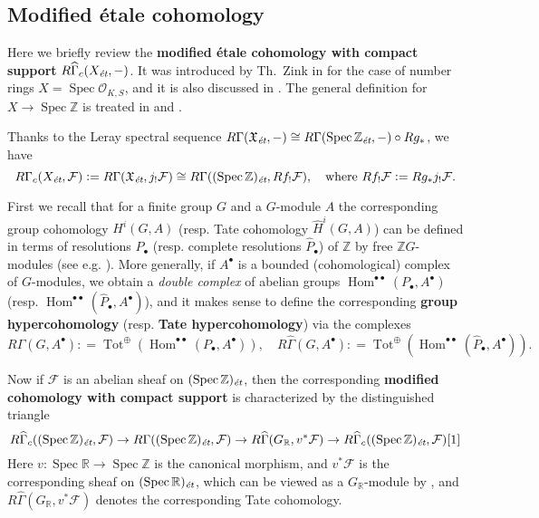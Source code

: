 \documentclass[leqno,12pt]{article}
\theoremstyle{plain}
\theoremstyle{definition}
\DeclareMathOperator{\Spec}{Spec}
\DeclareMathOperator{\Hom}{Hom}
\DeclareMathOperator{\Tot}{Tot}
\newcommand{\RR}{\mathbb{R}}
\newcommand{\ZZ}{\mathbb{Z}}
\newcommand{\dfn}{\mathrel{\mathop:}=}
\newcommand{\et}{\text{\it \'{e}t}}
\begin{document}
\subsection*{Modified \'{e}tale cohomology}

Here we briefly review the
\textbf{modified \'{e}tale cohomology with compact support}
$R\widehat{\Gamma}_c (X_\et, -)$. It was introduced by Th.~Zink in
\cite[Appendix~2]{Haberland-1978} for the case of number rings
$X = \Spec \mathcal{O}_{K,S}$, and it is also discussed in
\cite[\S II.2]{Milne-ADT}. The general definition for $X \to \Spec\ZZ$
is treated in \cite[\S 6.7]{Flach-Morin-2018} and
\cite[\S 2]{Geisser-Schmidt-2018}.

Thanks to the Leray spectral sequence
$R\Gamma (\mathfrak{X}_\et, -) \cong R\Gamma (\Spec \ZZ_\et, -)\circ R g_*$,
we have
\[
  R\Gamma_c (X_\et, \mathcal{F}) \dfn R\Gamma (\mathfrak{X}_\et, j_!\mathcal{F})
  \cong R\Gamma ((\Spec \ZZ)_\et, R f_! \mathcal{F}), \quad
  \text{where } Rf_! \mathcal{F} \dfn R g_* j_! \mathcal{F}.
\]

First we recall that for a finite group $G$ and a $G$-module $A$ the
corresponding group cohomology $H^i (G,A)$ (resp. Tate cohomology
$\widehat{H}^i (G,A)$) can be defined in terms of resolutions $P_\bullet$
(resp. complete resolutions $\widehat{P}_\bullet$) of $\ZZ$ by free
$\ZZ G$-modules (see e.g. \cite[Chapter~VI]{Brown-1994}). More
generally, if $A^\bullet$ is a bounded (cohomological) complex of
$G$-modules, we obtain a \emph{double complex} of abelian groups
$\Hom^{\bullet\bullet} (P_\bullet, A^\bullet)$ (resp.  $\Hom^{\bullet\bullet}
(\widehat{P}_\bullet, A^\bullet)$), and it makes sense to define the
corresponding \textbf{group hypercohomology}
(resp. \textbf{Tate hypercohomology}) via the complexes
\[ R\Gamma (G, A^\bullet) \dfn
\Tot^\oplus (\Hom^{\bullet\bullet} (P_\bullet, A^\bullet)), \quad
R\widehat{\Gamma} (G, A^\bullet) \dfn
\Tot^\oplus (\Hom^{\bullet\bullet} (\widehat{P}_\bullet, A^\bullet)). \]

Now if $\mathcal{F}$ is an abelian sheaf on $(\Spec \ZZ)_\et$, then the
corresponding \textbf{modified cohomology with compact support} is characterized
by the distinguished triangle
\[ R\widehat{\Gamma}_c ((\Spec \ZZ)_\et, \mathcal{F}) \to
R\Gamma ((\Spec \ZZ)_\et, \mathcal{F}) \to
R\widehat{\Gamma} (G_\RR, v^* \mathcal{F}) \to
R\widehat{\Gamma}_c ((\Spec \ZZ)_\et, \mathcal{F}) [1] \]
Here $v\colon \Spec \RR \to \Spec \ZZ$ is the canonical morphism, and
$v^* \mathcal{F}$ is the corresponding sheaf on $(\Spec \RR)_\et$, which can be
viewed as a $G_\RR$-module by \cite[Expos\'{e}~VII, 2.3]{SGA4}, and
$R\widehat{\Gamma} (G_\RR, v^* \mathcal{F})$ denotes the corresponding Tate
cohomology.
\end{document}
